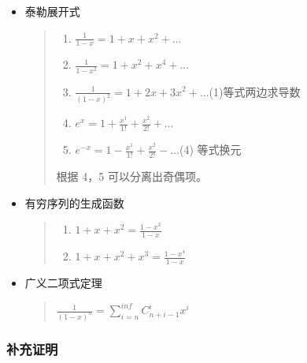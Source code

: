 \documentclass[a4paper,12pt]{article}
\begin{document}
\begin{itemize}
\item
泰勒展开式

\begin{quote}
\begin{enumerate}
\def\labelenumi{\arabic{enumi}.}
\item
\(\frac{1}{1-x}=1+x+x^2+...\)
\item
\(\frac{1}{1-x^2}=1+x^2+x^4+...\)
\item
\(\frac{1}{(1-x)^2} = 1 + 2x + 3x^2 + ...  \)(1)等式两边求导数
\item
\(e^x = 1 + \frac{x^1}{1!} + \frac{x^2}{2!} + ... \)
\item
\(e^{-x} = 1 - \frac{x^1}{1!} + \frac{x^2}{2!} - ... \)(4) 等式换元
\end{enumerate}

根据 4，5 可以分离出奇偶项。
\end{quote}
\item
有穷序列的生成函数
\begin{quote}
\begin{enumerate}
\def\labelenumi{\arabic{enumi}.}
\item
\(1 + x + x^2 = \frac{1-x^3}{1-x}\)
\item
\(1 + x + x^2 + x^3 = \frac{1-x^4}{1-x}\)
\end{enumerate}
\end{quote}

\item
广义二项式定理
\begin{quote}
\(\frac{1}{(1-x)^n} = \sum_{i=n}^{inf} C_{n+i-1}^i x^i\)
\end{quote}
\end{itemize}

\subsubsection{补充证明}
\end{document}
